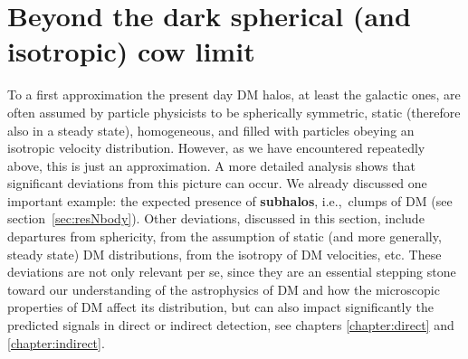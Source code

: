 \section{Beyond the dark spherical (and isotropic) cow limit}\label{sec:asphericalcow}
To a first approximation the present day DM halos, at least the galactic ones, 
are often assumed by particle physicists to be spherically symmetric, static (therefore also in a steady state), homogeneous,
and filled with particles obeying an isotropic velocity distribution. 
However, as we have encountered repeatedly above, this is just an approximation. 
A more detailed analysis shows that significant deviations from this picture can occur.
We already discussed one important example: the expected presence of {\bf subhalos}, i.e.,~clumps of DM (see section~\ref{sec:resNbody}).
Other deviations, discussed in this section, include departures from sphericity, from the assumption of static (and more generally, steady state) DM distributions, from the isotropy of DM velocities, etc.  
These deviations are not only relevant per se, since they are an essential stepping stone toward our understanding of the astrophysics of DM and how the microscopic properties of DM affect its distribution, but can also impact significantly the predicted signals in direct or indirect detection, see chapters \ref{chapter:direct} and \ref{chapter:indirect}.
 

